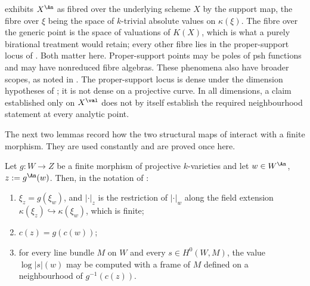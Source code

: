\begin{remark}
\label{rem:ch41-two-loci}
 exhibits $X^{\An}$ as fibred over the
underlying scheme $X$ by the support map, the fibre over $\xi$ being the
space of $k$-trivial absolute values on $\kappa(\xi)$.  The fibre over
the generic point is the space of valuations of $K(X)$, which is what a
purely birational treatment would retain; every other fibre lies in the
proper-support locus of .  Both matter here.
Proper-support points may be poles of psh functions and may have
nonreduced fibre algebras.  These phenomena also have broader scopes,
as noted in .  The proper-support locus is dense
under the dimension hypotheses of
; it is not dense on a projective
curve.  In all dimensions, a claim established only on $X^{\val}$
does not by itself establish the required neighbourhood statement at
every analytic point.
\end{remark}

The next two lemmas record how the two structural maps of
 interact with a finite morphism.  They
are used constantly and are proved once here.

\begin{lemma}
\label{lem:ch41-support-centre-finite}
Let $g:W\to Z$ be a finite morphism of projective $k$-varieties and let
$w\in W^{\An}$, $z:=g^{\An}(w)$.  Then, in the notation of
:
\begin{enumerate}
\item\label{itm:ch41-sc:supp}
      $\xi_z=g(\xi_w)$, and $|\cdot|_z$ is the restriction of
      $|\cdot|_w$ along the field extension
      $\kappa(\xi_z)\hookrightarrow\kappa(\xi_w)$, which is finite;
\item\label{itm:ch41-sc:centre}
      $c(z)=g(c(w))$;
\item\label{itm:ch41-sc:sections}
      for every line bundle $M$ on $W$ and every
      $s\in H^0(W,M)$, the value $\log|s|(w)$ may be computed with a
      frame of $M$ defined on a neighbourhood of $g^{-1}(c(z))$.
\end{enumerate}
\end{lemma}

